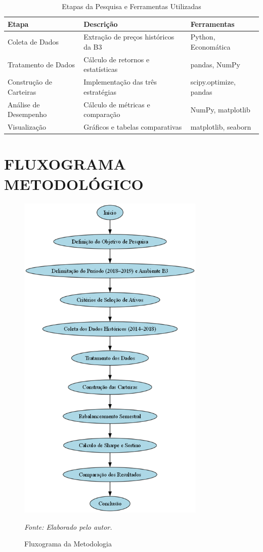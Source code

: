 \begin{table}[h]
\centering
\caption{Etapas da Pesquisa e Ferramentas Utilizadas}
\begin{tabular}{|p{4cm}|p{4cm}|p{4cm}|}
\hline
\textbf{Etapa} & \textbf{Descrição} & \textbf{Ferramentas} \\
\hline
Coleta de Dados & Extração de preços históricos da B3 & Python, Economática \\
\hline
Tratamento de Dados & Cálculo de retornos e estatísticas & pandas, NumPy \\
\hline
Construção de Carteiras & Implementação das três estratégias & scipy.optimize, pandas \\
\hline
Análise de Desempenho & Cálculo de métricas e comparação & NumPy, matplotlib \\
\hline
Visualização & Gráficos e tabelas comparativas & matplotlib, seaborn \\
\hline
\end{tabular}
\label{tab:etapas_pesquisa}
\end{table}

\section{FLUXOGRAMA METODOLÓGICO}

\begin{figure}[H]
\centering
\includegraphics[width=0.8\textwidth]{image.png}
\caption{Fluxograma da Metodologia}
\textit{Fonte: Elaborado pelo autor.}
\label{fig:fluxograma_metodologia}
\end{figure}

